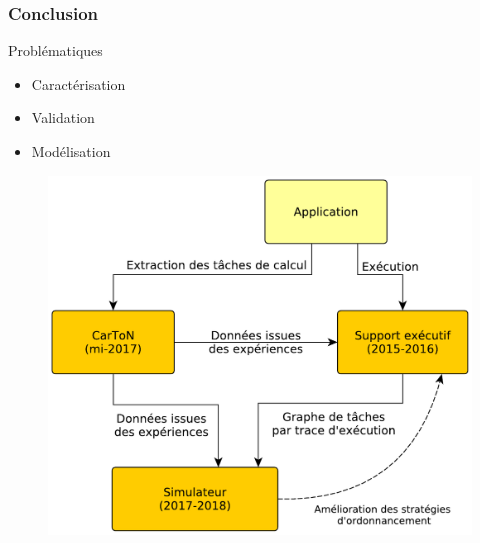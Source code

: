 \documentclass[xcolor={usenames,dvipsnames,svgnames,table}, aspectratio=43]{beamer}
\begin{document}
\begin{frame}
  \frametitle{Conclusion}

  \begin{minipage}[t]{0.36\linewidth}
    \begin{block}{Problématiques}
      \begin{itemize}
	\item Caractérisation
	\item Validation
	\item Modélisation
      \end{itemize}
    \end{block}
  \end{minipage}
      \hfill
  \begin{minipage}[t]{0.60\linewidth}
    \begin{figure}
      \includegraphics[width=\textwidth]{graph/big_picture-date.pdf}%
    \end{figure}
  \end{minipage}
\end{frame}
\end{document}
